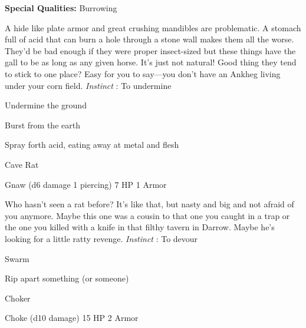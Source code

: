        
\startMonsterQualities
         {\bf Special Qualities:}  Burrowing
\stopMonsterQualities
       
\startMonsterDescription
A hide like plate armor and great crushing mandibles are problematic. A stomach full of acid that can burn a hole through a stone wall makes them all the worse. They’d be bad enough if they were proper insect-sized but these things have the gall to be as long as any given horse. It’s just not natural! Good thing they tend to stick to one place? Easy for you to say—you don’t have an Ankheg living under your corn field. {\em Instinct} : To undermine
\stopMonsterDescription
       
\startitemize[1,packed]
         
\item Undermine the ground

         
\item Burst from the earth

         
\item Spray forth acid, eating away at metal and flesh

       
\stopitemize
       
\startMonsterName
Cave Rat	 
\stopMonsterName
       

Gnaw (d6 damage 1 piercing)	7 HP	1 Armor

       


       
\startMonsterDescription
Who hasn’t seen a rat before? It’s like that, but nasty and big and not afraid of you anymore. Maybe this one was a cousin to that one you caught in a trap or the one you killed with a knife in that filthy tavern in Darrow. Maybe he’s looking for a little ratty revenge. {\em Instinct} : To devour
\stopMonsterDescription
       
\startitemize[1,packed]
         
\item Swarm

         
\item Rip apart something (or someone)

       
\stopitemize
       
\startMonsterName
Choker	 
\stopMonsterName
       

Choke (d10 damage)	15 HP	2 Armor

       


